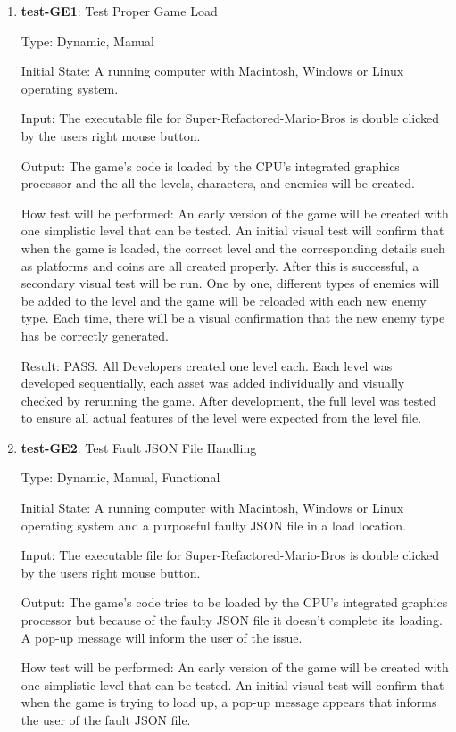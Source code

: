 \documentclass[12pt, titlepage]{article}
\begin{document}
\begin{enumerate}
\item{\textbf{test-GE1}: Test Proper Game Load\\}

Type: Dynamic, Manual
					
Initial State: A running computer with Macintosh, Windows or Linux operating system.
					
Input: The executable file for Super-Refactored-Mario-Bros is double clicked by the users right mouse button.
					
Output: The game's code is loaded by the CPU's integrated graphics processor and the all the levels, characters, and enemies will be created. 
					
How test will be performed: An early version of the game will be created with one simplistic level that can be tested. An initial visual test will confirm that when the game is loaded, the correct level and the corresponding details such as platforms and coins are all created properly. After this is successful, a secondary visual test will be run. One by one, different types of enemies will be added to the level and the game will be reloaded with each new enemy type. Each time, there will be a visual confirmation that the new enemy type has be correctly generated.

Result: PASS. All Developers created one level each. Each level was developed sequentially, each asset was added individually and visually checked by rerunning the game. After development, the full level was tested to ensure all actual features of the level were expected from the level file.

\item{\textbf{test-GE2}: Test Fault JSON File Handling\\}

Type: Dynamic, Manual, Functional
					
Initial State: A running computer with Macintosh, Windows or Linux operating system and a purposeful faulty JSON file in a load location.
					
Input: The executable file for Super-Refactored-Mario-Bros is double clicked by the users right mouse button.
					
Output: The game's code tries to be loaded by the CPU's integrated graphics processor but because of the faulty JSON file it doesn't complete its loading. A pop-up message will inform the user of the issue.
					
How test will be performed: An early version of the game will be created with one simplistic level that can be tested. An initial visual test will confirm that when the game is trying to load up, a pop-up message appears that informs the user of the fault JSON file.


\end{enumerate}
\end{document}
